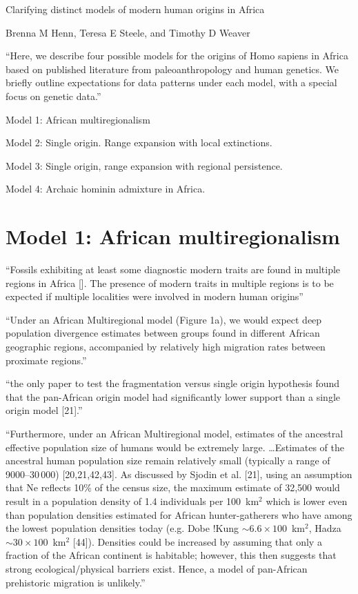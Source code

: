 \documentclass{article}
\begin{document}
Clarifying distinct models of modern human origins in Africa

Brenna M Henn, Teresa E Steele, and Timothy D Weaver

``Here, we describe four possible models for the origins of Homo
sapiens in Africa based on published literature from paleoanthropology
and human genetics. We briefly outline expectations for data patterns
under each model, with a special focus on genetic data.''

Model 1: African multiregionalism

Model 2: Single origin. Range expansion with local extinctions.

Model 3: Single origin, range expansion with regional persistence.

Model 4: Archaic hominin admixture in Africa.

\section{Model 1: African multiregionalism}

``Fossils exhibiting at least some diagnostic modern traits are found
in multiple regions in Africa []. The presence of modern traits in
multiple regions is to be expected if multiple localities were
involved in modern human origins''

``Under an African Multiregional model (Figure 1a), we would expect
deep population divergence estimates between groups found in different
African geographic regions, accompanied by relatively high migration
rates between proximate regions.''

``the only paper to test the fragmentation versus single origin
hypothesis found that the pan-African origin model had significantly
lower support than a single origin model [21].''

``Furthermore, under an African Multiregional model, estimates of the
ancestral effective population size of humans would be extremely
large. \ldots Estimates of the ancestral human population size remain
relatively small (typically a range of 9000--30\,000)
[20,21,42,43]. As discussed by Sjodin et al. [21], using an assumption
that Ne reflects 10\% of the census size, the maximum estimate of
32,500 would result in a population density of 1.4 individuals per
100~km$^2$ which is lower even than population densities estimated for
African hunter-gatherers who have among the lowest population
densities today (e.g. Dobe !Kung ${\sim}6.6 \times 100$~km$^2$, Hadza
${\sim}30 \times 100$~km$^2$ [44]). Densities could be increased by
assuming that only a fraction of the African continent is habitable;
however, this then suggests that strong ecological/physical barriers
exist. Hence, a model of pan-African prehistoric migration is
unlikely.''
\end{document}
